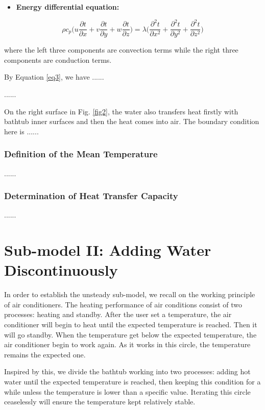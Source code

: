 \documentclass{mcmthesis}
\begin{document}
\begin{itemize}
\item {\bf Energy differential equation:}
\end{itemize}

\begin{equation} \label{eq3}
\rho c_p \Big( u\frac{\partial t}{\partial x} + v\frac{\partial t}{\partial y} + w\frac{\partial t}{\partial z} \Big) = \lambda \Big(\frac{\partial^2 t}{\partial x^2} + \frac{\partial^2 t}{\partial y^2} + \frac{\partial^2 t}{\partial z^2} \Big)
\end{equation}

\noindent where the left three components are convection terms while the right three components are conduction terms.

By Equation \eqref{eq3}, we have ......

......

On the right surface in Fig. \ref{fig2}, the water also transfers heat firstly with bathtub inner surfaces and then the heat comes into air. The boundary condition here is ......

\subsubsection{Definition of the Mean Temperature}

......

\subsubsection{Determination of Heat Transfer Capacity}

......

\section{Sub-model II: Adding Water Discontinuously}

In order to establish the unsteady sub-model, we recall on the working principle of air conditioners. The heating performance of air conditions consist of two processes: heating and standby. After the user set a temperature, the air conditioner will begin to heat until the expected temperature is reached. Then it will go standby. When the temperature get below the expected temperature, the air conditioner begin to work again. As it works in this circle, the temperature remains the expected one.

Inspired by this, we divide the bathtub working into two processes: adding
hot water until the expected temperature is reached, then keeping this
condition for a while unless the temperature is lower than a specific value. Iterating this circle ceaselessly will ensure the temperature kept relatively stable.
\end{document}
